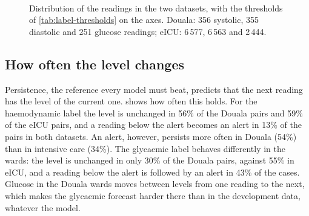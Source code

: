 \begin{figure}[htbp]
\centering
{}\\[2pt]
\caption{Distribution of the readings in the two datasets, with the thresholds of \cref{tab:label-thresholds} on the axes. Douala: 356 systolic, 355 diastolic and 251 glucose readings; eICU: 6\,577, 6\,563 and 2\,444.}\label{fig:values}
\end{figure}

\subsection{How often the level changes}\label{sec:results-transitions}

Persistence, the reference every model must beat, predicts that the next reading has the level of the current one.  shows how often this holds. For the haemodynamic label the level is unchanged in 56\% of the Douala pairs and 59\% of the eICU pairs, and a reading below the alert becomes an alert in 13\% of the pairs in both datasets. An alert, however, persists more often in Douala (54\%) than in intensive care (34\%). The glycaemic label behaves differently in the wards: the level is unchanged in only 30\% of the Douala pairs, against 55\% in eICU, and a reading below the alert is followed by an alert in 43\% of the cases. Glucose in the Douala wards moves between levels from one reading to the next, which makes the glycaemic forecast harder there than in the development data, whatever the model.

